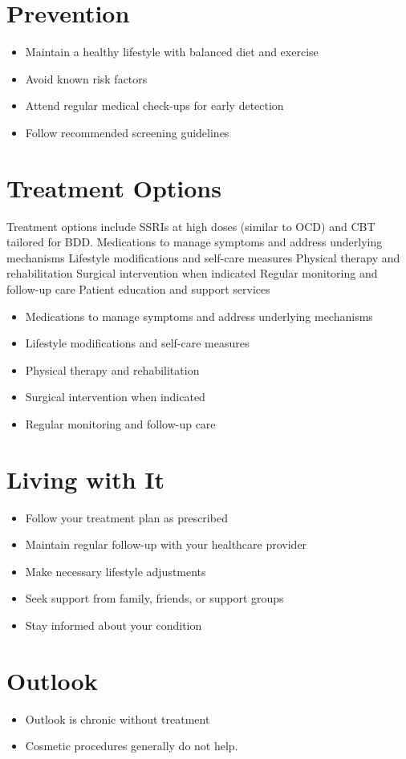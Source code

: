 \section{Prevention}
\begin{itemize}[noitemsep]
  \item Maintain a healthy lifestyle with balanced diet and exercise
  \item Avoid known risk factors
  \item Attend regular medical check-ups for early detection
  \item Follow recommended screening guidelines
\end{itemize}
\section{Treatment Options}
Treatment options include SSRIs at high doses (similar to OCD) and CBT tailored for BDD. Medications to manage symptoms and address underlying mechanisms Lifestyle modifications and self-care measures Physical therapy and rehabilitation Surgical intervention when indicated Regular monitoring and follow-up care Patient education and support services

\begin{itemize}[noitemsep]
  \item Medications to manage symptoms and address underlying mechanisms
  \item Lifestyle modifications and self-care measures
  \item Physical therapy and rehabilitation
  \item Surgical intervention when indicated
  \item Regular monitoring and follow-up care
\end{itemize}
\section{Living with It}
\begin{itemize}[noitemsep]
  \item Follow your treatment plan as prescribed
  \item Maintain regular follow-up with your healthcare provider
  \item Make necessary lifestyle adjustments
  \item Seek support from family, friends, or support groups
  \item Stay informed about your condition
\end{itemize}
\section{Outlook}
\begin{itemize}[noitemsep]
  \item Outlook is chronic without treatment
  \item Cosmetic procedures generally do not help.
\end{itemize}

